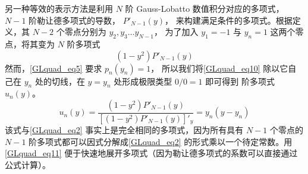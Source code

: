 另一种等效的表示方法是利用 $N$ 阶 Gauss-Lobatto 数值积分对应的多项式， $N-1$ 阶勒让德多项式的导数， $P'_{N-1}(y)$，  来构建满足条件的多项式。根据定义，其 $N-2$ 个零点分别为 $y_2, y_3\dots y_{N-1}$， 为了加入 $y_1=-1$ 与 $y_n=1$ 这两个零点，将其变为 $N$ 阶多项式
\begin{equation}\label{GLquad_eq10}
(1-y^2)P'_{N-1}(y)
\end{equation}
然而，\autoref{GLquad_eq5} 要求 $p_n(y_n)=1$， 所以我们将\autoref{GLquad_eq10} 除以它自己在 $y_n$ 处的切线，在 $y=y_n$ 处形成极限类型 $0/0=1$ 即可得到 阶多项式 $u_n(y)$。 
\begin{equation}\label{GLquad_eq11}
u_n(y) = \frac{(1-y^2)P'_{N-1}(y)}{[(1-y^2)P'_{N-1}(y)]'_y} = y_n (y-y_n)
\end{equation}
该式与\autoref{GLquad_eq2} 事实上是完全相同的多项式，因为所有具有 $N-1$ 个零点的 $N-1$ 阶多项式都可以因式分解成\autoref{GLquad_eq2} 的形式乘以一个待定常数。用\autoref{GLquad_eq11} 便于快速地展开多项式（因为勒让德多项式的系数可以直接通过公式计算）。
